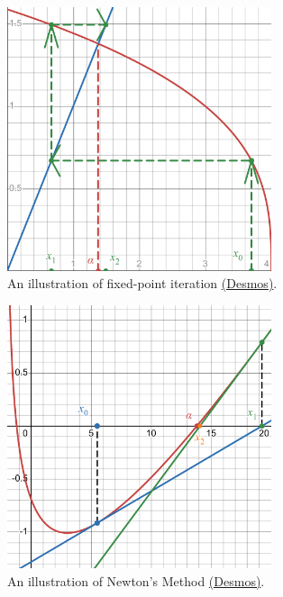 \documentclass[../Notes.tex]{subfiles}
\begin{document}
    \begin{figure}[H]
        \centering
        \includegraphics[width=0.69\textwidth]{../Diagrams/fixed-point-iteration/fixed-point-iteration-desmos.pdf}
        \caption{An illustration of fixed-point iteration \href{https://www.desmos.com/calculator/t9mnqtmhxw}{(Desmos)}.}
        \label{fig:fixed-point-iteration}
    \end{figure}
    \begin{figure}[H]
        \centering
        \includegraphics[width=0.69\textwidth]{../Diagrams/newton's-method.pdf}
        \caption{An illustration of Newton's Method \href{https://www.desmos.com/calculator/izkg4ynlfp}{(Desmos)}.}
        \label{fig:newton's-method}
    \end{figure}
\end{document}
